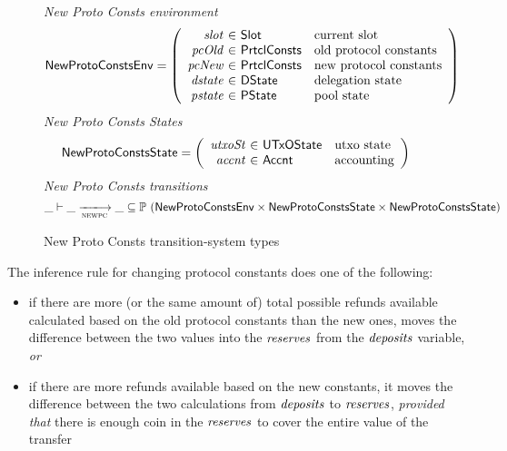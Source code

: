 \begin{figure}[htb]
  \emph{New Proto Consts environment}
  \begin{equation*}
    \NewProtoConstsEnv =
    \left(
      \begin{array}{r@{~\in~}ll}
        \var{slot} & \Slot & \text{current slot}\\
        \var{pcOld} & \PrtclConsts & \text{old protocol constants}\\
        \var{pcNew} & \PrtclConsts & \text{new protocol constants}\\
        \var{dstate} & \DState & \text{delegation state}\\
        \var{pstate} & \PState & \text{pool state}\\
      \end{array}
    \right)
  \end{equation*}
  \emph{New Proto Consts States}
  \begin{equation*}
    \NewProtoConstsState =
    \left(
      \begin{array}{r@{~\in~}ll}
        \var{utxoSt} & \UTxOState & \text{utxo state}\\
        \var{accnt} & \Accnt & \text{accounting}\\
      \end{array}
    \right)
  \end{equation*}
  \emph{New Proto Consts transitions}
  \begin{equation*}
    \_ \vdash
    \var{\_} \trans{newpc}{} \var{\_}
    \subseteq \powerset (\NewProtoConstsEnv \times
    \NewProtoConstsState \times \NewProtoConstsState)
  \end{equation*}
  \caption{New Proto Consts transition-system types}
  \label{fig:ts-types:new-proto-consts}
\end{figure}


The inference rule for changing protocol constants does one of the following:

\begin{itemize}
\item if there are more (or the same amount of) total possible refunds
available calculated based on the old protocol constants than the new ones,
moves the difference between the two values into the $\mathit{reserves}$
from the $\mathit{deposits}$ variable, \textit{or}

\item if there are more refunds available based on the new constants, it moves
the difference between the two calculations from $\mathit{deposits}$
to $\mathit{reserves}$, \textit{provided that} there is enough coin in the
$\mathit{reserves}$ to cover the entire value of the transfer
\end{itemize}


